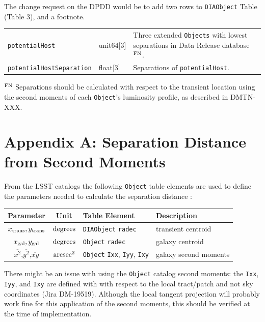 \documentclass[DM,authoryear,toc]{lsstdoc}
\begin{document}
The change request on the DPDD would be to add two rows to {\tt DIAObject} Table (Table 3), and a footnote.

\begin{tabular}{p{4.5cm} p{2cm} p{8cm}}
{\tt potentialHost} & unit64[3] & Three extended {\tt Objects} with lowest separations in Data Release database$^{\rm FN}$. \\
{\tt potentialHostSeparation} & float[3] & Separations of {\tt potentialHost}.   \\
\end{tabular}

$^{\rm FN}$ Separations should be calculated with respect to the transient location using the second moments of each {\tt Object}'s luminosity profile, as described in DMTN-XXX.



\clearpage
\section{Appendix A: Separation Distance from Second Moments}\label{sec:appA}

From the LSST catalogs the following {\tt Object} table elements are used to define the parameters needed to calculate the separation distance :

\begin{center}
\begin{tabular}{ccll}
\hline
Parameter & Unit & Table Element & Description \\
\hline
$x_{\rm trans},y_{\rm trans}$ & $\rm degrees$ & {\tt DIAObject} {\tt radec} & transient centroid  \\
$x_{\rm gal},y_{\rm gal}$       & $\rm degrees$ & {\tt Object} {\tt radec}       & galaxy centroid      \\
$\overline{x^2}$,$\overline{y^2}$,$\overline{xy}$ & $\rm arcsec^2$  & {\tt Object} {\tt Ixx}, {\tt Iyy}, {\tt Ixy} & galaxy second moments \\
\hline
\end{tabular}
\end{center}

There might be an issue with using the {\tt Object} catalog second moments: the {\tt Ixx}, {\tt Iyy}, and {\tt Ixy} are defined with with respect to the local tract/patch and not sky coordinates (Jira DM-19519).
Although the local tangent projection will probably work fine for this application of the second moments, this should be verified at the time of implementation.
\end{document}
